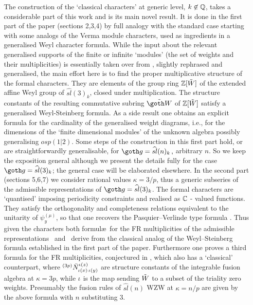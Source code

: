 The construction of  the  `classical characters' at generic
level, $k\not \in {\Bbb Q}$, takes a considerable part  of this work
and is its main novel result. 
It is done in the first part of the paper
(sections 2,3,4) by full analogy with the standard case starting
with 
some  analogs of the Verma module characters, 
used as ingredients in a generalised Weyl character formula.
While the input about the relevant
generalised supports of the finite or infinite `modules' (the set
of weights and their multiplicities) is essentially taken over
from \FGP, slightly rephrased and generalised, the main effort
here is to find the proper multiplicative structure of the formal
characters.  They are  elements of the group ring $\Bbb Z[\tilde W]$ of
the extended affine Weyl group  of $\widehat{sl}(3)_k$, closed
under multiplication. The structure constants of the resulting
commutative subring $\tCR$ of $\Bbb Z[\tilde W]$ satisfy  a generalised
Weyl-Steinberg formula.  As a side result one obtains an explicit
formula for the cardinality of the generalised weight diagrams,
i.e., for  the dimensions of the `finite dimensional  modules' of
the unknown algebra possibly generalising $osp(1|2)$.  
Some steps of the construction in this first part hold, or are
straightforwardly generalisable, for $\go=\widehat{sl}(n)_k\,,$
arbitrary $n$. So we keep the exposition general although 
we present the details fully for the case
$\go=\widehat{sl}(3)_k$; the general case will be elaborated
elsewhere.  In the second part (sections 5,6,7) we consider
rational values $\kappa=3/p$, thus a generic subseries of the
admissible representations of $\go=\widehat{sl}(3)_k$. The formal
characters are `quantised' imposing periodicity constraints and
realised as $\Bbb C$ - valued functions.  They satisfy the
orthogonality and completeness relations equivalent to the
unitarity of $\psi_y^{(\mu)}$, so that one  recovers the
Pasquier--Verlinde type formula \pasv.  Thus given the characters
both  formul\ae\ for the FR multiplicities of the admissible
representations \pasv\ and \ws\ derive from the classical analog
of the Weyl--Steinberg formula established in the first part of
the paper. Furthermore one proves a third formula for the FR
multiplicities, conjectured in \FGP, which also has a `classical'
counterpart,
%
\eqn{}
%
where ${}^{(3 p)}\bar{N}^{\iota(z)}_{\iota(x)\,\iota(y)}$ are
structure constants of the integrable  fusion algebra at
$\kappa=3p$, while $\iota$ is the map sending $\tilde W$ to a subset of
the triality zero weights. Presumably the fusion rules of
$\widehat{sl}(n)$ WZW at  $\kappa =n/p$ are given by the above
formula with $n$ substituting $3$.

